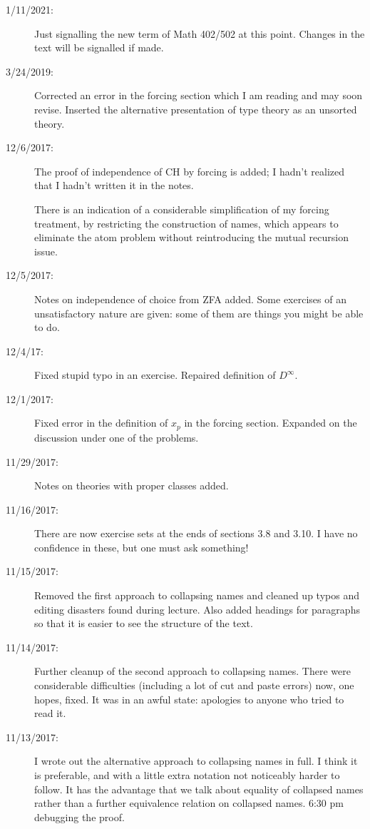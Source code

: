 \documentclass[12pt]{book}
\begin{document}
{\begin{description}
\item[1/11/2021:]  Just signalling the new term of Math 402/502 at this point.  Changes in the text will be signalled if made.

\item[3/24/2019:]  Corrected an error in the forcing section which I am reading and may soon revise.  Inserted the alternative presentation of type theory as an unsorted theory.

\item[12/6/2017:]  The proof of independence of CH by forcing is added;  I hadn't realized that I hadn't written it in the notes.

There is an indication of a considerable simplification of my forcing treatment, by restricting the construction of names, which appears to eliminate the atom problem without reintroducing the mutual recursion issue.

\item[12/5/2017:]  Notes on independence of choice from ZFA added.  Some exercises of an unsatisfactory nature are given:  some of them are things you might be able to do.

\item[12/4/17:]  Fixed stupid typo in an exercise.  Repaired definition of $D^{\infty}$.

\item[12/1/2017:]  Fixed error in the definition of $x_p$ in the forcing section.  Expanded on the discussion under one of the problems.

\item[11/29/2017:]  Notes on theories with proper classes added.

\item[11/16/2017:]  There are now exercise sets at the ends of sections 3.8 and 3.10.  I have no confidence in these, but one must ask something!

\item[11/15/2017:]  Removed the first approach to collapsing names and cleaned up typos and editing disasters found during lecture.   Also added headings for paragraphs so that it is easier to see the structure of the text.

\item[11/14/2017:]  Further cleanup of the second approach to collapsing names.  There were considerable difficulties (including a lot of cut and paste errors) now, one hopes, fixed.  It was in an awful state:  apologies to anyone who tried to read it.

\item[11/13/2017:]  I wrote out the alternative approach to collapsing names in full.  I think it is preferable, and with a little extra notation not noticeably harder to follow.  It has the advantage that we talk about equality of collapsed names rather than a further equivalence relation on collapsed names.  6:30 pm debugging the  proof.


\end{description}}
\end{document}
